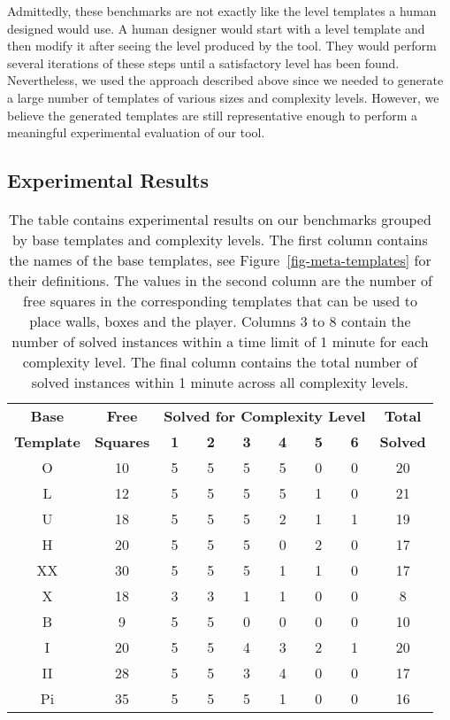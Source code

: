 \documentclass[runningheads]{llncs}
\begin{document}
Admittedly, these benchmarks are not exactly like the level templates a human designed would use. A human
designer would start with a level template and then modify it after seeing the level produced by the tool.
They would perform several iterations of these steps until a satisfactory level has been found. Nevertheless,
we used the approach described above since we needed to generate a large number of templates of various
sizes and complexity levels. However, we believe the generated templates are still representative enough
to perform a meaningful experimental evaluation of our tool.

\subsection{Experimental Results}
\begin{table}[t]
\setlength{\tabcolsep}{11pt}
\renewcommand{\arraystretch}{1.25}
\centering
\begin{tabular}{|c|c||c c c c c c|c|}
\hline
\textbf{\textbf{Base}} & \textbf{\textbf{Free}} & \multicolumn{6}{c|}{\textbf{Solved for Complexity Level}} & \textbf{Total} \\ 
\textbf{Template} & \textbf{Squares} & \textbf{1} & \textbf{2} & \textbf{3} & \textbf{4} & \textbf{5} & \textbf{6} & \textbf{Solved} \\ 
\hline 
\rowcolor{mygray} 
O  & 10 &   5 &  5 &  5  & 5 &  0 &  0 & 20 \\
L  & 12 &   5 &  5 &  5  & 5 &  1 &  0 & 21 \\
\rowcolor{mygray} 
U  & 18 &   5 &  5 &  5  & 2 &  1 &  1 & 19 \\
H  & 20 &   5 &  5 &  5  & 0 &  2 &  0 & 17 \\
\rowcolor{mygray} 
XX & 30 &   5 &  5 &  5  & 1 &  1 &  0 & 17 \\
X  & 18 &   3 &  3 &  1  & 1 &  0 &  0 & 8  \\
\rowcolor{mygray} 
B  & 9  &   5 &  5 &  0  & 0 &  0 &  0 & 10 \\
I  & 20 &   5 &  5 &  4  & 3 &  2 &  1 & 20 \\
\rowcolor{mygray} 
II & 28 &   5 &  5 &  3  & 4 &  0 &  0 & 17 \\
Pi & 35 &   5 &  5 &  5  & 1 &  0 &  0 & 16 \\
\hline 
\end{tabular} 
\vspace{1em}
\caption{The table contains experimental results on our benchmarks grouped by base templates and complexity
levels. The first column contains the names of the base templates, see Figure~\ref{fig-meta-templates} for
their definitions. The values in the second column are the number of free squares in the corresponding templates
that can be used to place walls, boxes and the player.
Columns 3 to 8 contain the number of solved instances within a time limit of 1 minute for each complexity level.
The final column contains the total number of solved instances within 1 minute across all complexity
levels.}
\label{tab-results}
\end{table}
\end{document}

